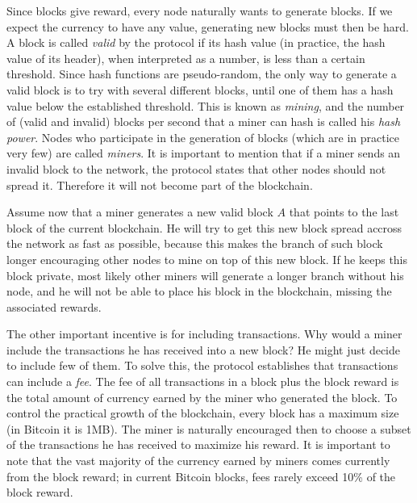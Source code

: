 Since blocks give reward, every node naturally wants to generate blocks. If we expect the currency to have any value, generating new blocks must then be hard. A block is called \emph{valid} by the protocol if its hash value (in practice, the hash value of its header), when interpreted as a number, is less than a certain threshold. Since hash functions are pseudo-random, the only way to generate a valid block is to try with several different blocks, until one of them has a hash value below the established threshold. This is known as \emph{mining}, and the number of (valid and invalid) blocks per second that a miner can hash is called his \emph{hash power}. Nodes who participate in the generation of blocks (which are in practice very few) are called \emph{miners}. It is important to mention that if a miner sends an invalid block to the network, the protocol states that other nodes should not spread it. Therefore it will not become part of the blockchain.

Assume now that a miner generates a new valid block $A$ that points to the last block of the current blockchain. He will try to get this new block spread accross the network as fast as possible, because this makes the branch of such block longer encouraging other nodes to mine on top of this new block. If he keeps this block private, most likely other miners will generate a longer branch without his node, and he will not be able to place his block in the blockchain, missing the associated rewards.

The other important incentive is for including transactions. Why would a miner include the transactions he has received into a new block? He might just decide to include few of them. To solve this, the protocol establishes that transactions can include a \emph{fee}. The fee of all transactions in a block plus the block reward is the total amount of currency earned by the miner who generated the block. To control the practical growth of the blockchain, every block has a maximum size (in Bitcoin it is 1MB). The miner is naturally encouraged then to choose a subset of the transactions he has received to maximize his reward. It is important to note that the vast majority of the currency earned by miners comes currently from the block reward; in current Bitcoin blocks, fees rarely exceed 10\% of the block reward.

